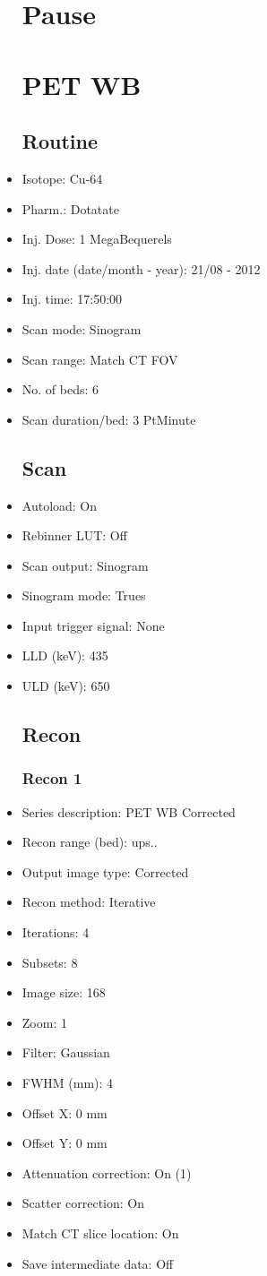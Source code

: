 \documentclass[12pt]{article}
\begin{document}
\begin{itemize}
\section{Pause}

\section{PET WB}
\subsection{Routine}
\item Isotope: Cu-64
\item Pharm.: Dotatate
\item Inj. Dose: 1 MegaBequerels
\item Inj. date (date/month - year): 21/08 - 2012
\item Inj. time: 17:50:00
\item Scan mode: Sinogram
\item Scan range: Match CT FOV
\item No. of beds: 6
\item Scan duration/bed: 3 PtMinute
\subsection{Scan}
\item Autoload: On
\item Rebinner LUT: Off
\item Scan output: Sinogram
\item Sinogram mode: Trues
\item Input trigger signal: None
\item LLD (keV): 435
\item ULD (keV): 650
\subsection{Recon}

\subsubsection{Recon 1}
\item Series description: PET WB Corrected 
\item Recon range (bed): ups..
\item Output image type: Corrected
\item Recon method: Iterative
\item Iterations: 4
\item Subsets: 8
\item Image size: 168
\item Zoom: 1
\item Filter: Gaussian
\item FWHM (mm): 4
\item Offset X: 0 mm
\item Offset Y: 0 mm
\item Attenuation correction: On (1)
\item Scatter correction: On
\item Match CT slice location: On
\item Save intermediate data: Off

\end{itemize}
\end{document}
